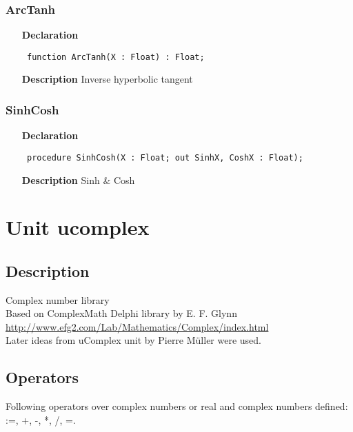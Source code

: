 \documentclass[12pt,a4paper,oneside]{report}
\newcommand{\lmath}[1]{   %
	\marginpar{\vspace{#1} 
		\begin{flushright}
			LMath
	\end{flushright} }
}
\newcommand{\declarationitem}[1]{\textbf{#1}}
\newcommand{\descriptiontitle}[1]{\textbf{#1}}
\newcommand{\code}[1]{\texttt{#1}}
\begin{document}
\subsubsection{ArcTanh}
\label{uhyper-ArcTanh}
\begin{itemize}\item[\declarationitem{Declaration}\hfill]
	\begin{flushleft}
		\code{
			function ArcTanh(X : Float) : Float;}
		
	\end{flushleft}
	
	\par
	\item[\descriptiontitle{Description}]
	Inverse hyperbolic tangent
	
\end{itemize}
\subsubsection{SinhCosh}
\label{uhyper-SinhCosh}
\begin{itemize}\item[\declarationitem{Declaration}\hfill]
	\begin{flushleft}
		\code{
			procedure SinhCosh(X : Float; out SinhX, CoshX : Float);}
		
	\end{flushleft}
	
	\par
	\item[\descriptiontitle{Description}]
	Sinh {\&} Cosh
	
\end{itemize}


\section{Unit ucomplex}
\label{ucomplex}
\subsection{Description}
Complex number library \\
Based on ComplexMath Delphi library by E. F. Glynn\\ \href{http://www.efg2.com/Lab/Mathematics/Complex/index.html}{http://www.efg2.com/Lab/Mathematics/Complex/index.html} \\Later ideas from uComplex unit by Pierre M\"uller were used. 
\subsection{Operators} \lmath{-24pt}
Following operators over complex numbers or real and complex numbers defined: :=, +, -, *, /, =.
\end{document}
